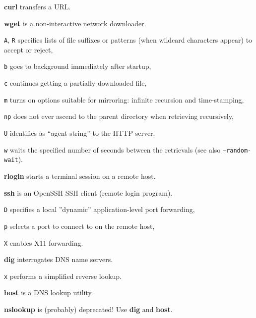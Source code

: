 \begin{compactenum}
\item [\cmdvar] \textbf{curl} transfers a URL.
\item [\cmdvar] \textbf{wget} is a non-interactive network downloader.
\item [\texttt{A}, \texttt{R}] specifies lists 	of file suffixes or 
	patterns (when wildcard characters appear) to accept or reject,
\item [\texttt{b}] goes to background immediately after startup,
\item [\texttt{c}] continues getting a partially-downloaded file,
\item [\texttt{m}] turns on options suitable for mirroring: 
	infinite recursion and time-stamping,
\item [\texttt{np}] does not ever ascend to the
	parent directory when retrieving recursively,
\item [\texttt{U}] identifies as ``agent-string'' to the HTTP server.
\item [\texttt{w}] waits the specified number of seconds 
	between the retrievals (see also \texttt{--random-wait}).
\end{compactenum}

\begin{compactenum}
\item [\cmdvar] \textbf{rlogin} starts a terminal session on a remote host.
\item [\cmdvar] \textbf{ssh} is an OpenSSH SSH client (remote login program).
\item [\texttt{D}] specifies a local ''dynamic'' application-level port forwarding,
\item [\texttt{p}] selects a port to connect to on the remote host,
\item [\texttt{X}] enables X11 forwarding.
\end{compactenum}

\begin{compactenum}
\item [\cmdvar] \textbf{dig} interrogates DNS name servers.                        
\item [\texttt{x}] performs a simplified reverse lookup. 
\item [\cmdvar] \textbf{host} is a DNS lookup utility.  
\item [\cmdvar] \textbf{nslookup} is (probably) deprecated! Use \textbf{dig} and \textbf{host}.
\end{compactenum}

